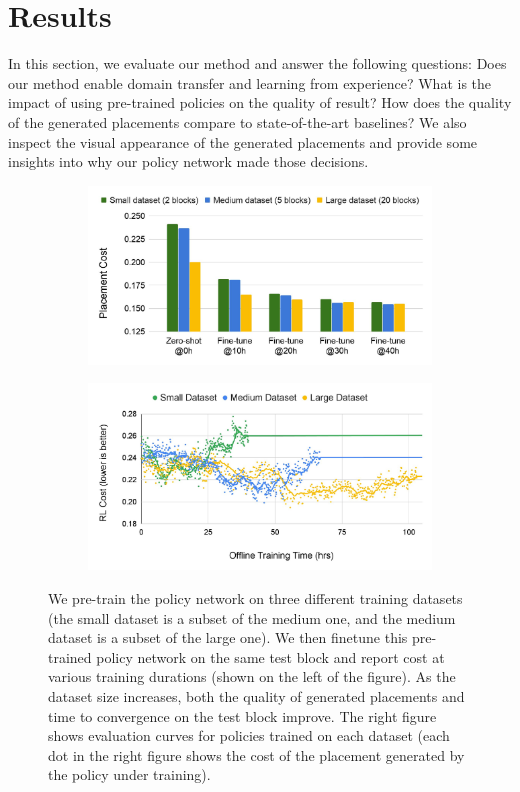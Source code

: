 \documentclass{article}
\begin{document}
\section{Results}\label{section:results}
In this section, we evaluate our method and answer the following questions: Does our method enable domain transfer and learning from experience? What is the impact of using pre-trained policies on the quality of result? How does the quality of the generated placements compare to state-of-the-art baselines? We also inspect the visual appearance of the generated placements and provide some insights into why our policy network made those decisions.

\begin{figure}[t]
    \centering
    \begin{subfigure}
        \centering
        \includegraphics[width=0.45\linewidth]{datasetsize-vs-performance-cropped.pdf}
    \end{subfigure}
    \begin{subfigure}
        \centering  
        \includegraphics[width=0.45\linewidth]{finetuned-datasize-cropped.pdf}
    \end{subfigure}
    \caption{We pre-train the policy network on three different training datasets (the small dataset is a subset of the medium one, and the medium dataset is a subset of the large one). We then finetune this pre-trained policy network on the same test block and report cost at various training durations (shown on the left of the figure). As the dataset size increases, both the quality of generated placements and time to convergence on the test block improve. The right figure shows  evaluation curves for policies trained on each dataset (each dot in the right figure shows the cost of the placement generated by the policy under training).}
    \label{fig:trainingsize}
\end{figure}
\end{document}
